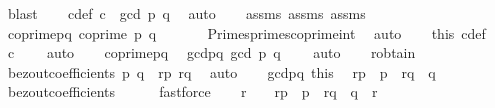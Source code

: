 \begin{isabellebody}
\ blast\isanewline
\ \ \isamarkupfalse%
\ c{\isacharunderscore}{\kern0pt}def{\isacharcolon}{\kern0pt}\ {\isachardoublequoteopen}c\ {\isacharequal}{\kern0pt}\ gcd\ p\ q{\isachardoublequoteclose}\ \isamarkupfalse%
\ auto\isanewline
\ \ \isamarkupfalse%
\ assms{\isacharparenleft}{\kern0pt}{}{\isacharparenright}{\kern0pt}\ assms{\isacharparenleft}{\kern0pt}{}{\isacharparenright}{\kern0pt}\ assms{\isacharparenleft}{\kern0pt}{}{\isacharparenright}{\kern0pt}\ \isamarkupfalse%
\ coprime{\isacharunderscore}{\kern0pt}pq{\isacharcolon}{\kern0pt}\ {\isachardoublequoteopen}coprime\ p\ q{\isachardoublequoteclose}\ \isanewline
\ \ \ \ \isamarkupfalse%
\ Primes{\isachardot}{\kern0pt}primes{\isacharunderscore}{\kern0pt}coprime{\isacharunderscore}{\kern0pt}int\ \isamarkupfalse%
\ auto\isanewline
\ \ \isamarkupfalse%
\ this\ c{\isacharunderscore}{\kern0pt}def\ \isamarkupfalse%
\ {\isachardoublequoteopen}c\ {\isacharequal}{\kern0pt}\ {}{\isachardoublequoteclose}\ \isamarkupfalse%
\ auto\isanewline
\isanewline
\ \ \isamarkupfalse%
\ coprime{\isacharunderscore}{\kern0pt}pq\ \isamarkupfalse%
\ gcd{\isacharunderscore}{\kern0pt}pq{\isacharcolon}{\kern0pt}\ {\isachardoublequoteopen}gcd\ p\ q\ {\isacharequal}{\kern0pt}\ {}{\isachardoublequoteclose}\ \isamarkupfalse%
\ auto\isanewline
\isanewline
\ \ \isamarkupfalse%
\ r{\isacharunderscore}{\kern0pt}obtain\ \isamarkupfalse%
\ {\isachardoublequoteopen}bezout{\isacharunderscore}{\kern0pt}coefficients\ p\ q\ {\isacharequal}{\kern0pt}\ {\isacharparenleft}{\kern0pt}r{\isacharunderscore}{\kern0pt}p{\isacharcomma}{\kern0pt}\ r{\isacharunderscore}{\kern0pt}q{\isacharparenright}{\kern0pt}{\isachardoublequoteclose}\ \isamarkupfalse%
\ auto\isanewline
\ \ \isamarkupfalse%
\ gcd{\isacharunderscore}{\kern0pt}pq\ this\ \isamarkupfalse%
\ {\isachardoublequoteopen}r{\isacharunderscore}{\kern0pt}p\ {\isacharasterisk}{\kern0pt}\ p\ {\isacharplus}{\kern0pt}\ r{\isacharunderscore}{\kern0pt}q\ {\isacharasterisk}{\kern0pt}\ q\ {\isacharequal}{\kern0pt}\ {}{\isachardoublequoteclose}\isanewline
\ \ \ \ \isamarkupfalse%
\ bezout{\isacharunderscore}{\kern0pt}coefficients\isanewline
\ \ \ \ \isamarkupfalse%
\ fastforce\isanewline
\ \ \isamarkupfalse%
\ {\isachardoublequoteopen}{\isacharparenleft}{\kern0pt}r\ {\isacharcircum}{\kern0pt}\ {}{\isacharparenright}{\kern0pt}\ {\isacharasterisk}{\kern0pt}\ {\isacharparenleft}{\kern0pt}r{\isacharunderscore}{\kern0pt}p\ {\isacharasterisk}{\kern0pt}\ p\ {\isacharplus}{\kern0pt}\ r{\isacharunderscore}{\kern0pt}q\ {\isacharasterisk}{\kern0pt}\ q{\isacharparenright}{\kern0pt}\ {\isacharequal}{\kern0pt}\ {\isacharparenleft}{\kern0pt}r\ {\isacharcircum}{\kern0pt}\ {}{\isacharparenright}{\kern0pt}\ {\isacharasterisk}{\kern0pt}\ {}{\isachardoublequoteclose}\ \isamarkupfalse%

\end{isabellebody}
